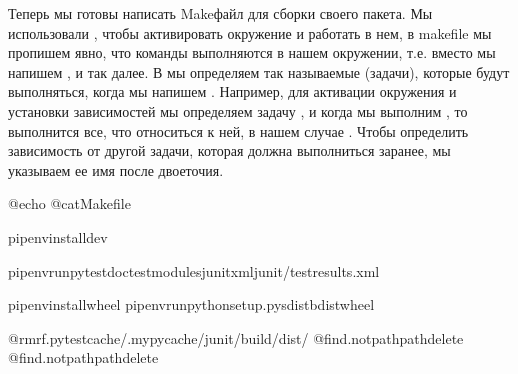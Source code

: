 \documentclass[letterpaper,10pt,russian]{sphinxmanual}
\begin{document}
\sphinxAtStartPar
Теперь мы готовы написать Make\sphinxhyphen{}файл для сборки своего пакета. Мы использовали , чтобы активировать окружение и работать в нем, в makefile мы пропишем явно, что команды выполняются в нашем окружении, т.е. вместо  мы напишем , и так далее. В  мы определяем так называемые  (задачи), которые будут выполняться, когда мы напишем . Например, для активации окружения и установки зависимостей мы определяем задачу , и когда мы выполним , то выполнится все, что относиться к ней, в нашем случае . Чтобы определить зависимость от другой задачи, которая должна выполниться заранее, мы указываем ее имя после двоеточия.

\begin{sphinxVerbatim}[commandchars=\\\{\}]
@echo
@catMakefile

pipenvinstall\PYGZhy{}\PYGZhy{}dev

pipenvrunpytest\PYGZhy{}\PYGZhy{}doctest\PYGZhy{}modules\PYGZhy{}\PYGZhy{}junitxmljunit/test\PYGZhy{}results.xml

pipenvinstallwheel
pipenvrunpythonsetup.pysdistbdist\PYGZus{}wheel

@rm\PYGZhy{}rf.pytest\PYGZus{}cache/.mypy\PYGZus{}cache/junit/build/dist/
@find.\PYGZhy{}not\PYGZhy{}path\PYGZhy{}path\PYGZhy{}delete
@find.\PYGZhy{}not\PYGZhy{}path\PYGZhy{}path\PYGZhy{}delete
\end{sphinxVerbatim}
\end{document}
